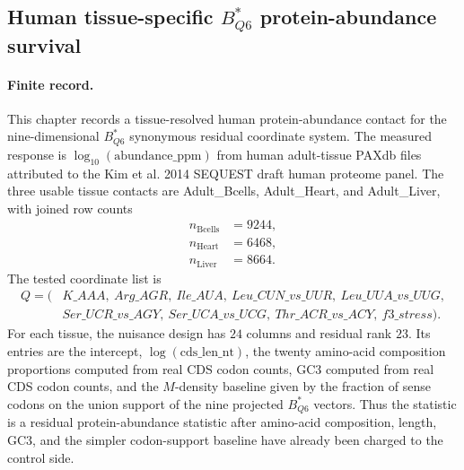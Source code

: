
\subsection{Human tissue-specific $B^{\ast}_{Q6}$ protein-abundance survival}
\label{subsec:bioreality-human-tissue-specific-sqp-b-star-q6}

\paragraph{Finite record.}
This chapter records a tissue-resolved human protein-abundance contact for the nine-dimensional $B^{\ast}_{Q6}$ synonymous residual coordinate system.  The measured response is $\log_{10}(\mathrm{abundance\_ppm})$ from human adult-tissue PAXdb files attributed to the Kim et al. 2014 SEQUEST draft human proteome panel.  The three usable tissue contacts are Adult\_Bcells, Adult\_Heart, and Adult\_Liver, with joined row counts
$$
\begin{aligned}
 n_{\mathrm{Bcells}} &= 9244,\\
 n_{\mathrm{Heart}} &= 6468,\\
 n_{\mathrm{Liver}} &= 8664.
\end{aligned}
$$
The tested coordinate list is
$$
\begin{aligned}
Q = (&K\_AAA,\ Arg\_AGR,\ Ile\_AUA,\ Leu\_CUN\_vs\_UUR,\ Leu\_UUA\_vs\_UUG,\\
&Ser\_UCR\_vs\_AGY,\ Ser\_UCA\_vs\_UCG,\ Thr\_ACR\_vs\_ACY,\ f3\_stress).
\end{aligned}
$$
For each tissue, the nuisance design has $24$ columns and residual rank $23$.  Its entries are the intercept, $\log(\mathrm{cds\_len\_nt})$, the twenty amino-acid composition proportions computed from real CDS codon counts, GC3 computed from real CDS codon counts, and the $M$-density baseline given by the fraction of sense codons on the union support of the nine projected $B^{\ast}_{Q6}$ vectors.  Thus the statistic is a residual protein-abundance statistic after amino-acid composition, length, GC3, and the simpler codon-support baseline have already been charged to the control side.

